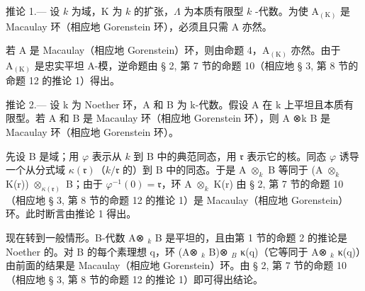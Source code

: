 推论 1.--- 设 \(k\) 为域，K 为 \(k\) 的扩张，\(\Lambda\) 为本质有限型 \(k\) -代数。为使 \(\mathrm{A}_{(\mathrm{K})}\) 是 Macaulay 环（相应地 Gorenstein 环），必须且只需 A 亦然。

若 A 是 Macaulay（相应地 Gorenstein）环，则由命题 4，\(\mathrm{A}_{(\mathrm{K})}\) 亦然。由于 \(\mathrm{A}_{(\mathrm{K})}\) 是忠实平坦 A-模，逆命题由 § 2, 第 7 节的命题 10（相应地 § 3, 第 8 节的命题 12 的推论 1）得出。

推论 2.--- 设 k 为 Noether 环，A 和 B 为 k-代数。假设 A 在 k 上平坦且本质有限型。若 A 和 B 是 Macaulay 环（相应地 Gorenstein 环），则 A ⊗k B 是 Macaulay 环（相应地 Gorenstein 环）。

先设 B 是域；用 \(\varphi\) 表示从 \(k\) 到 B 中的典范同态，用 \(\mathfrak{r}\) 表示它的核。同态 \(\varphi\) 诱导一个从分式域 \(\kappa(\mathfrak{r})\)（\(k/\mathfrak{r}\) 的）到 B 中的同态。于是 A \(\otimes_{k}\) B 等同于 (A \(\otimes_{k}\) K(r)) \(\otimes_{\kappa(\mathfrak{r})}\) B；由于 \(\varphi^{-1}(0)=\mathfrak{r}\)，环 A \(\otimes_{k}\) K(r) 由 § 2, 第 7 节的命题 10（相应地 § 3, 第 8 节的命题 12 的推论 1）是 Macaulay（相应地 Gorenstein）环。此时断言由推论 1 得出。

现在转到一般情形。B-代数 A⊗ \(_{k}\) B 是平坦的，且由第 1 节的命题 2 的推论是 Noether 的。对 B 的每个素理想 q，环 (A⊗ \(_{k}\) B)⊗ \(_{B}\) κ(q)（它等同于 A⊗ \(_{k}\) κ(q)）由前面的结果是 Macaulay（相应地 Gorenstein）环。由 § 2, 第 7 节的命题 10（相应地 § 3, 第 8 节的命题 12 的推论 1）即可得出结论。


